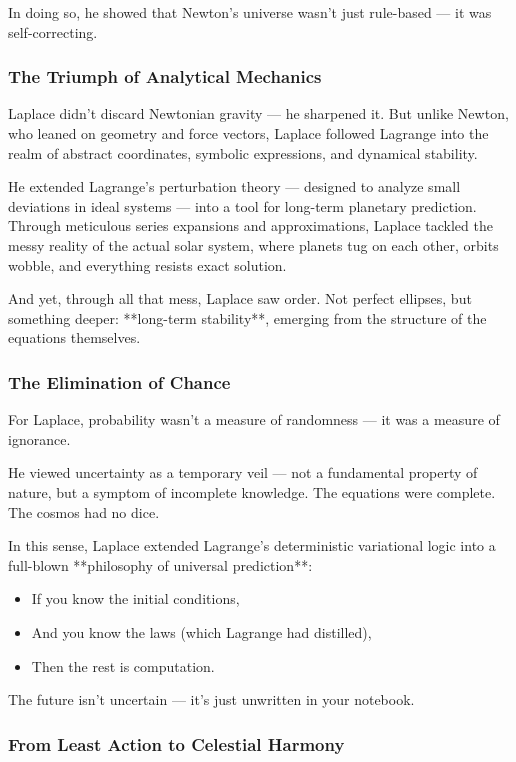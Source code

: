 In doing so, he showed that Newton’s universe wasn’t just rule-based — it was self-correcting.

\subsubsection*{The Triumph of Analytical Mechanics}

Laplace didn’t discard Newtonian gravity — he sharpened it.  
But unlike Newton, who leaned on geometry and force vectors, Laplace followed Lagrange into the realm of abstract coordinates, symbolic expressions, and dynamical stability.

He extended Lagrange’s perturbation theory — designed to analyze small deviations in ideal systems — into a tool for long-term planetary prediction. Through meticulous series expansions and approximations, Laplace tackled the messy reality of the actual solar system, where planets tug on each other, orbits wobble, and everything resists exact solution.

And yet, through all that mess, Laplace saw order.  
Not perfect ellipses, but something deeper: **long-term stability**, emerging from the structure of the equations themselves.

\subsubsection*{The Elimination of Chance}

For Laplace, probability wasn’t a measure of randomness — it was a measure of ignorance.

He viewed uncertainty as a temporary veil — not a fundamental property of nature, but a symptom of incomplete knowledge. The equations were complete. The cosmos had no dice.

In this sense, Laplace extended Lagrange’s deterministic variational logic into a full-blown **philosophy of universal prediction**:
\begin{itemize}
    \item If you know the initial conditions,
    \item And you know the laws (which Lagrange had distilled),
    \item Then the rest is computation.
\end{itemize}

The future isn’t uncertain — it's just unwritten in your notebook.

\subsubsection*{From Least Action to Celestial Harmony}

